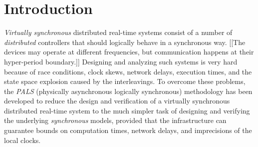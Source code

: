 

\section{Introduction}

\emph{Virtually synchronous} distributed real-time systems consist of
a number of \emph{distributed} controllers that should logically
behave in a synchronous way. [[The devices may operate at different
frequencies, but  communication happens at their hyper-period
boundary.]] Designing and analyzing  such systems is very hard because
of race conditions, clock skews, network delays, execution times, and
the state space explosion caused by the interleavings. To overcome
these problems, 
the \emph{PALS} (physically asynchronous logically synchronous) methodology
\cite{pals-rtss09,mr-pals-journal,pals-tcs,al2012pattern} has been
developed to reduce the design and verification of a virtually
synchronous distributed real-time system to the much simpler task  of designing and
verifying the underlying \emph{synchronous} models,
provided that the  infrastructure can guarantee bounds
on computation times, network delays, and imprecisions of the local clocks.






